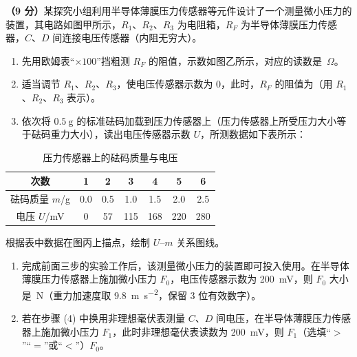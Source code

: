 \begin{question}
\textbf{（9 分）}某探究小组利用半导体薄膜压力传感器等元件设计了一个测量微小压力的装置，其电路如图甲所示，$R_{1}$、$R_{2}$、$R_{3}$ 为电阻箱，$R_{F}$ 为半导体薄膜压力传感器，$C$、$D$ 间连接电压传感器（内阻无穷大）。


\begin{enumerate}[leftmargin=2em, label=(\arabic*)]
  \item 先用欧姆表“$\times100$”挡粗测 $R_{F}$ 的阻值，示数如图乙所示，对应的读数是\gkblank~$\Omega$。


  \item 适当调节 $R_{1}$、$R_{2}$、$R_{3}$，使电压传感器示数为 0，此时，$R_{F}$ 的阻值为\gkblank（用 $R_{1}$、$R_{2}$、$R_{3}$ 表示）。
  \item 依次将 $\SI{0.5}{\gram}$ 的标准砝码加载到压力传感器上（压力传感器上所受压力大小等于砝码重力大小），读出电压传感器示数 $U$，所测数据如下表所示：
\end{enumerate}

\begin{table}[ht]
\centering
\caption{压力传感器上的砝码质量与电压}
\small
\begin{tabular}{ccccccc}
\toprule
次数 & 1 & 2 & 3 & 4 & 5 & 6\\
\midrule
砝码质量 $m$/g & 0.0 & 0.5 & 1.0 & 1.5 & 2.0 & 2.5\\
电压 $U$/mV & 0 & 57 & 115 & 168 & 220 & 280\\
\bottomrule
\end{tabular}
\end{table}

根据表中数据在图丙上描点，绘制 $U$--$m$ 关系图线。


\begin{enumerate}[leftmargin=2em, label=(\arabic*), start=4]
  \item 完成前面三步的实验工作后，该测量微小压力的装置即可投入使用。在半导体薄膜压力传感器上施加微小压力 $F_{0}$，电压传感器示数为 \SI{200}{\milli\volt}，则 $F_{0}$ 大小是\gkblank~N（重力加速度取 \SI{9.8}{\metre\per\second\squared}，保留 3 位有效数字）。
  \item 若在步骤 (4) 中换用非理想毫伏表测量 $C$、$D$ 间电压，在半导体薄膜压力传感器上施加微小压力 $F_{1}$，此时非理想毫伏表读数为 \SI{200}{\milli\volt}，则 $F_{1}$\gkblank（选填“$>$”“$=$”或“$<$”）$F_{0}$。
\end{enumerate}
\end{question}

